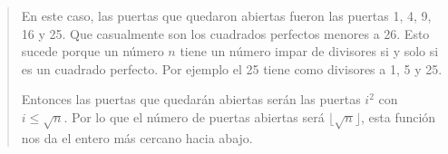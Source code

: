 \begin{quote}
    En este caso, las puertas que quedaron abiertas fueron las puertas 1, 4, 9, 16 y 25. Que casualmente son los cuadrados perfectos menores a 26. Esto sucede porque un número $n$ tiene un número impar de divisores si y solo si es un cuadrado perfecto. Por ejemplo el 25 tiene como divisores a 1, 5 y 25. \vspace{.2cm}

    Entonces las puertas que quedarán abiertas serán las puertas $i^2$ con $i \leq \sqrt{n}$. Por lo que el número de puertas abiertas será $\lfloor \sqrt{n} \rfloor$, esta función nos da el entero más cercano hacia abajo.
\end{quote}